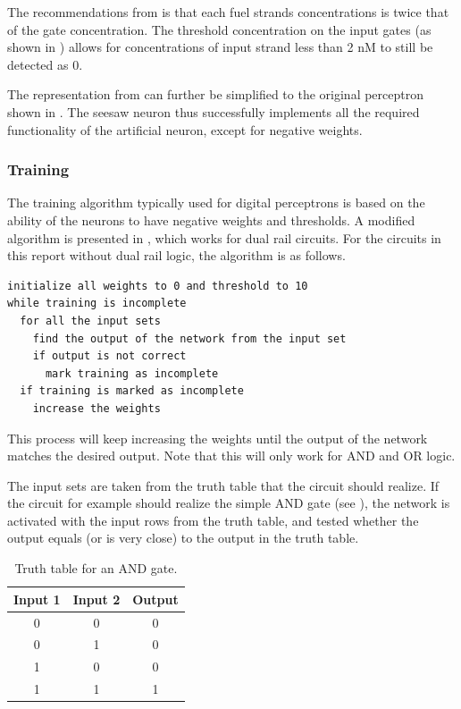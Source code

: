 The recommendations from \cite{Qian2011} is that each fuel strands concentrations is twice that of the gate concentration. The threshold concentration on the input gates (as shown in ) allows for concentrations of input strand less than 2 nM to still be detected as 0.

The representation from  can further be simplified to the original perceptron shown in . The seesaw neuron thus successfully implements all the required functionality of the artificial neuron, except for negative weights.

\subsubsection{Training}
The training algorithm typically used for digital perceptrons is based on the ability of the neurons to have negative weights and thresholds. A modified algorithm is presented in \cite{Qian2011}, which works for dual rail circuits. For the circuits in this report without dual rail logic, the algorithm is as follows.

\begin{lstlisting}
initialize all weights to 0 and threshold to 10
while training is incomplete
  for all the input sets
    find the output of the network from the input set
    if output is not correct
      mark training as incomplete
  if training is marked as incomplete
    increase the weights
\end{lstlisting}

This process will keep increasing the weights until the output of the network matches the desired output. Note that this will only work for AND and OR logic.

The input sets are taken from the truth table that the circuit should realize. If the circuit for example should realize the simple AND gate (see ), the network is activated with the input rows from the truth table, and tested whether the output equals (or is very close) to the output in the truth table.

\begin{table}[]
\centering
\begin{tabular}{ccc}
  \hline
\multicolumn{1}{l}{\textbf{Input 1}} & \multicolumn{1}{l}{\textbf{Input 2}} & \multicolumn{1}{l}{\textbf{Output}} \\
\hline
0                                    & 0                                    & 0                                   \\
0                                    & 1                                    & 0                                   \\
1                                    & 0                                    & 0                                   \\
1                                    & 1                                    & 1 \\
\hline
\end{tabular}
\caption{Truth table for an AND gate.}
\label{and_table}
\end{table}

